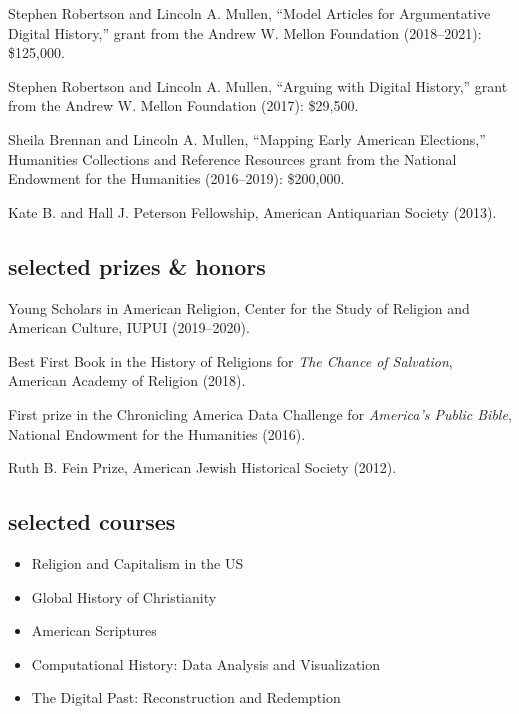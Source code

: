 \documentclass[11pt]{article}
\providecommand{\tightlist}{%
  \setlength{\itemsep}{0pt}\setlength{\parskip}{0pt}}
\begin{document}
Stephen Robertson and Lincoln A. Mullen, ``Model Articles for Argumentative Digital History,'' grant from the Andrew W. Mellon Foundation (2018--2021): \$125,000.

Stephen Robertson and Lincoln A. Mullen, ``Arguing with Digital History,'' grant from the Andrew W. Mellon Foundation (2017): \$29,500.

Sheila Brennan and Lincoln A. Mullen, ``Mapping Early American Elections,'' Humanities Collections and Reference Resources grant from the National Endowment for the Humanities (2016--2019): \$200,000. 

Kate B. and Hall J. Peterson Fellowship, American Antiquarian Society (2013). 

\subsection{selected prizes \& honors}\label{prizes-and-honors}

Young Scholars in American Religion, Center for the Study of Religion and American Culture, IUPUI (2019--2020).

Best First Book in the History of Religions for \emph{The Chance of Salvation}, American Academy of Religion (2018).

First prize in the Chronicling America Data Challenge for \emph{America's Public Bible}, National Endowment for the Humanities (2016).

Ruth B. Fein Prize, American Jewish Historical Society (2012). 

\subsection{selected courses}\label{teaching}

\begin{itemize}
  \tightlist
  \item Religion and Capitalism in the US 
  \item Global History of Christianity 
  \item American Scriptures 
  \item Computational History: Data Analysis and Visualization 
  \item The Digital Past: Reconstruction and Redemption 
\end{itemize}
\end{document}
